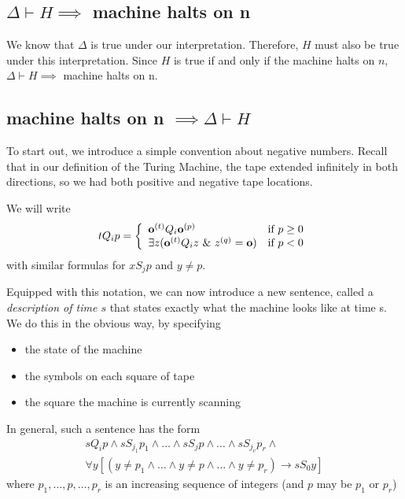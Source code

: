 \subsection{$\Delta \vdash H \implies$ machine halts on n}

We know that $\Delta$ is true under our interpretation.  Therefore, $H$ must also be true under this interpretation.
Since $H$ is true if and only if the machine halts on $n$, $\Delta \vdash H \implies$ machine halts on n.

\subsection{machine halts on n $\implies \Delta \vdash H$}

To start out, we introduce a simple convention about negative numbers. Recall that in our definition of the Turing Machine, the tape extended infinitely in both directions, so we had both positive and negative tape locations.

We will write  $$tQ_ip = \left\{\begin{array}{ll}  \mathbf{o}^{(t)}Q_i\mathbf{o}^{(p)} & \text{if }p \ge 0 \\ 
 \exists z (\mathbf{o}^{(t)}Q_iz ~\&~ z^{(q)} = \mathbf{o}) & \text{if } p < 0 \end{array}\right.$$ with similar formulas for $xS_jp$ and $y \ne p$.

Equipped with this notation, we can now introduce a new sentence, called a \textit{description of time $s$} that states exactly what the machine looks like at time s. We do this in the obvious way, by specifying

\begin{itemize}
\item the state of the machine
\item the symbols on each square of tape
\item the square the machine is currently scanning
\end{itemize}

In general, such a sentence has the form
\begin{eqnarray*}\label{descAtTime}
sQ_ip \land s S_{j_1} p_1 \land \dots\land s S_j p \land \dots \land s S_{j_v}p_r \land \\
\forall y[(y\ne p_1\land\dots\land y\ne p \land \dots \land y\ne p_r ) \rightarrow s S_0y]
\end{eqnarray*}
where $p_1, \dots , p, \dots, p_r$ is an increasing sequence of integers (and $p$ may be $p_1$ or $p_r$)

